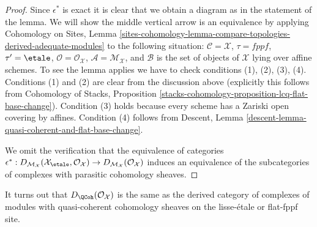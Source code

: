 \begin{proof}
Since $\epsilon^*$ is exact it is clear that we obtain a diagram as
in the statement of the lemma. We will show the middle vertical
arrow is an equivalence by applying
Cohomology on Sites, Lemma
\ref{sites-cohomology-lemma-compare-topologies-derived-adequate-modules}
to the following situation:
$\mathcal{C} = \mathcal{X}$,
$\tau = fppf$,
$\tau' = \etale$,
$\mathcal{O} = \mathcal{O}_\mathcal{X}$,
$\mathcal{A} = \mathcal{M}_\mathcal{X}$, and
$\mathcal{B}$ is the set of objects of $\mathcal{X}$ lying over
affine schemes. To see the lemma applies we have to check conditions
(1), (2), (3), (4). Conditions (1) and (2) are clear from the discussion
above (explicitly this follows from
Cohomology of Stacks,
Proposition \ref{stacks-cohomology-proposition-lcq-flat-base-change}).
Condition (3) holds because every scheme has a Zariski
open covering by affines. Condition (4) follows from
Descent, Lemma \ref{descent-lemma-quasi-coherent-and-flat-base-change}.

\medskip\noindent
We omit the verification that the equivalence of
categories $\epsilon^* : 
D_{\mathcal{M}_\mathcal{X}}(
\mathcal{X}_\etale, \mathcal{O}_\mathcal{X})
\to
D_{\mathcal{M}_\mathcal{X}}(\mathcal{O}_\mathcal{X})$
induces an equivalence of the subcategories of complexes
with parasitic cohomology sheaves.
\end{proof}

\noindent
It turns out that $D_\QCoh(\mathcal{O}_\mathcal{X})$
is the same as the derived category of complexes of modules
with quasi-coherent cohomology sheaves on the lisse-\'etale or
flat-fppf site.

